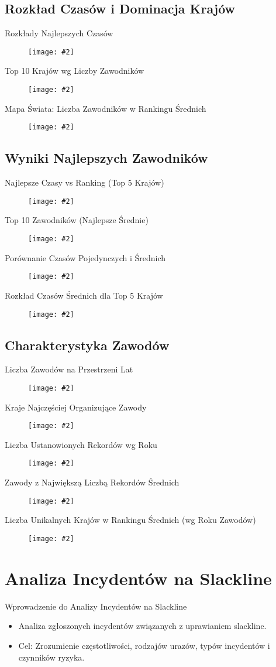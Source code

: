 \documentclass[10pt]{beamer} %
\newcommand{\fullslideimage}[3][width=\textwidth,height=0.75\textheight,keepaspectratio]{
  \begin{frame}{#3} %
    \begin{figure}
      \centering
      \texttt{[image: \#2]} %
    \end{figure}
  \end{frame}
}
\begin{document}
\subsection{Rozkład Czasów i Dominacja Krajów}
\fullslideimage{02b\_rozkłady\_czasow\_łączone.png}{Rozkłady Najlepszych Czasów}
\fullslideimage{04b\_top10\_krajow\_łączone.png}{Top 10 Krajów wg Liczby Zawodników}
\fullslideimage{15\_mapa\_zawodnicy\_srednie.png}{Mapa Świata: Liczba Zawodników w Rankingu Średnich}

\subsection{Wyniki Najlepszych Zawodników}
\fullslideimage{06b\_czas\_vs\_ranking\_łączone.png}{Najlepsze Czasy vs Ranking (Top 5 Krajów)}
\fullslideimage{10\_top10\_zawodnikow\_srednie.png}{Top 10 Zawodników (Najlepsze Średnie)}
\fullslideimage{09\_porownanie\_czasow\_pojed\_sred.png}{Porównanie Czasów Pojedynczych i Średnich}
\fullslideimage{14\_boxplot\_srednie\_top5\_kraje.png}{Rozkład Czasów Średnich dla Top 5 Krajów}


\subsection{Charakterystyka Zawodów}
\fullslideimage{07\_liczba\_zawodow\_lata.png}{Liczba Zawodów na Przestrzeni Lat}
\fullslideimage{08\_top15\_kraje\_organizujace.png}{Kraje Najczęściej Organizujące Zawody}
\fullslideimage{12b\_rekordy\_rok\_łączone.png}{Liczba Ustanowionych Rekordów wg Roku}
\fullslideimage{13\_top10\_zawody\_rekordy\_srednie.png}{Zawody z Największą Liczbą Rekordów Średnich}
\fullslideimage{17\_unikalne\_kraje\_rekordy\_srednie\_lata.png}{Liczba Unikalnych Krajów w Rankingu Średnich (wg Roku Zawodów)}


\section{Analiza Incydentów na Slackline}

\begin{frame}{Wprowadzenie do Analizy Incydentów na Slackline}
    \begin{itemize}
        \item Analiza zgłoszonych incydentów związanych z uprawianiem slackline.
        \item Cel: Zrozumienie częstotliwości, rodzajów urazów, typów incydentów i czynników ryzyka.
    \end{itemize}
\end{frame}
\end{document}
